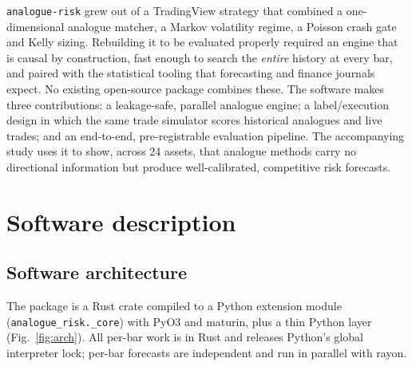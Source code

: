 \documentclass[preprint,12pt]{elsarticle}
\begin{document}
\texttt{analogue-risk} grew out of a TradingView strategy that combined a one-dimensional
analogue matcher, a Markov volatility regime, a Poisson crash gate and Kelly sizing. Rebuilding it
to be evaluated properly required an engine that is causal by construction, fast enough to
search the \emph{entire} history at every bar, and paired with the statistical tooling that
forecasting and finance journals expect. No existing open-source package combines these. The
software makes three contributions: a leakage-safe, parallel analogue engine; a label/execution
design in which the same trade simulator scores historical analogues and live trades; and an
end-to-end, pre-registrable evaluation pipeline. The accompanying study \cite{dasari_research}
uses it to show, across 24 assets, that analogue methods carry no directional information but
produce well-calibrated, competitive risk forecasts.

\section{Software description}

\subsection{Software architecture}
The package is a Rust crate compiled to a Python extension module (\texttt{analogue\_risk.\_core}) with PyO3
and maturin, plus a thin Python layer (Fig.~\ref{fig:arch}). All per-bar work is in Rust and
releases Python's global interpreter lock; per-bar forecasts are independent and run in parallel
with rayon.
\end{document}
